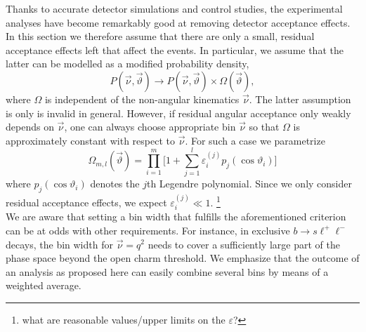 \documentclass[aps,prd,reprint,nofootinbib,preprintnumbers]{revtex4}
\newcommand{\nuvec}{\vec{\nu}}
\newcommand{\thvec}{\vec{\vartheta}}
\renewcommand{\theta}{\vartheta}
\let\eps\varepsilon
\newcommand{\danny}[1]{{\color{purple}#1}}
\begin{document}
Thanks to accurate detector simulations and control studies, the experimental analyses have become
remarkably good at removing detector acceptance effects. In this section we therefore assume that
there are only a small, residual acceptance effects left that affect the events. In particular, we
assume that the latter can be modelled as a modified probability density,
\begin{equation}
    \label{eq:PDFwithDE}
    P(\nuvec,\thvec) \to P(\nuvec,\thvec) \times \Omega(\thvec),
\end{equation}
where $\Omega$ is independent of the non-angular kinematics $\nuvec$. The latter assumption is only
is invalid in general. However, if residual angular acceptance only weakly depends on $\vec{\nu}$, one
can always choose appropriate bin $\vec{\nu}$ so that $\Omega$ is approximately constant with respect
to $\vec{\nu}$. For such a case we parametrize
\begin{equation}
    \Omega_{m,l}(\thvec) = \prod_{i=1}^{m} \Big[1 + \sum_{j=1}^l \eps_i^{(j)} p_j(\cos\theta_i)\big]
\end{equation}
where $p_j(\cos\theta_i)$ denotes the $j$th Legendre polynomial. Since we only consider residual
acceptance effects, we expect $\eps_i^{(j)} \ll 1$. \footnote{\danny{what are reasonable values/upper limits on the $\eps$?}}\\

We are aware that setting a bin width that fulfills the aforementioned criterion can be at odds with
other requirements. For instance, in exclusive $b\to s\ell^+\ell^-$ decays, the bin width for
$\vec{\nu} = q^2$ needs to cover a sufficiently large part of the phase space beyond the open charm
threshold. We emphasize that the outcome of an analysis as proposed here can easily combine several
bins by means of a weighted average.\\
\end{document}
